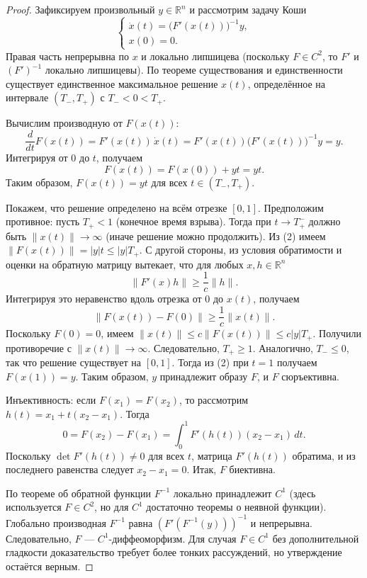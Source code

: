 \begin{proof}
    Зафиксируем произвольный \(y \in \mathbb{R}^n\) и рассмотрим задачу Коши
    \[
    \begin{cases}
        \dot{x}(t) = \bigl(F'(x(t))\bigr)^{-1} y,\\
        x(0) = 0.
    \end{cases}
    \tag{1}
    \]
    Правая часть непрерывна по \(x\) и локально липшицева (поскольку \(F \in C^2\), то \(F'\) и \((F')^{-1}\) локально липшицевы). По теореме существования и единственности существует единственное максимальное решение \(x(t)\), определённое на интервале \((T_-, T_+)\) с \(T_- < 0 < T_+\).

    Вычислим производную от \(F(x(t))\):
    \[
    \frac{d}{dt}F(x(t)) = F'(x(t))\,\dot{x}(t) = F'(x(t))\bigl(F'(x(t))\bigr)^{-1}y = y.
    \]
    Интегрируя от \(0\) до \(t\), получаем
    \[
    F(x(t)) = F(x(0)) + y t = y t. \tag{2}
    \]
    Таким образом, \(F(x(t)) = y t\) для всех \(t \in (T_-, T_+)\).

    Покажем, что решение определено на всём отрезке \([0,1]\). Предположим противное: пусть \(T_+ < 1\) (конечное время взрыва). Тогда при \(t \to T_+^-\) должно быть \(\|x(t)\| \to \infty\) (иначе решение можно продолжить). Из (2) имеем \(\|F(x(t))\| = |y| t \le |y| T_+\). С другой стороны, из условия обратимости и оценки на обратную матрицу вытекает, что для любых \(x, h \in \mathbb{R}^n\)
    \[
    \|F'(x)h\| \ge \frac{1}{c}\|h\|.
    \]
    Интегрируя это неравенство вдоль отрезка от \(0\) до \(x(t)\), получаем
    \[
    \|F(x(t)) - F(0)\| \ge \frac{1}{c}\|x(t)\|.
    \]
    Поскольку \(F(0)=0\), имеем \(\|x(t)\| \le c \|F(x(t))\| \le c|y| T_+\). Получили противоречие с \(\|x(t)\| \to \infty\). Следовательно, \(T_+ \ge 1\). Аналогично, \(T_- \le 0\), так что решение существует на \([0,1]\). Тогда из (2) при \(t=1\) получаем \(F(x(1)) = y\). Таким образом, \(y\) принадлежит образу \(F\), и \(F\) сюръективна.

    Инъективность: если \(F(x_1) = F(x_2)\), то рассмотрим \(h(t) = x_1 + t(x_2 - x_1)\). Тогда
    \[
    0 = F(x_2) - F(x_1) = \int_0^1 F'(h(t))(x_2 - x_1)\,dt.
    \]
    Поскольку \(\det F'(h(t)) \ne 0\) для всех \(t\), матрица \(F'(h(t))\) обратима, и из последнего равенства следует \(x_2 - x_1 = 0\). Итак, \(F\) биективна.

    По теореме об обратной функции \(F^{-1}\) локально принадлежит \(C^1\) (здесь используется \(F \in C^2\), но для \(C^1\) достаточно теоремы о неявной функции). Глобально производная \(F^{-1}\) равна \((F'(F^{-1}(y)))^{-1}\) и непрерывна. Следовательно, \(F\) — \(C^1\)-диффеоморфизм. Для случая \(F \in C^1\) без дополнительной гладкости доказательство требует более тонких рассуждений, но утверждение остаётся верным.
\end{proof}

